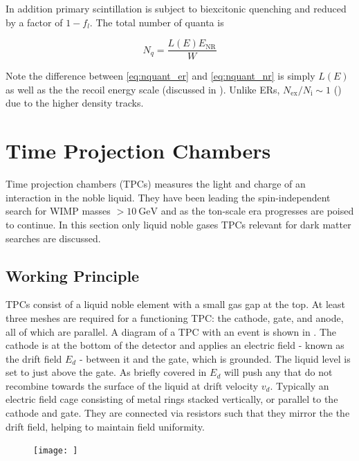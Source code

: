 In addition primary scintillation is subject to biexcitonic quenching and reduced by a factor of $1 - f_{l}$.  The total number of quanta
is

\begin{equation}
N_{q} = \frac{L(E) E_{\mathrm{NR}}}{W}
\label{eq:nquant_nr}
\end{equation}

\noindent Note the difference between \eqref{eq:nquant_er} and \eqref{eq:nquant_nr} is simply $L(E)$ as well as the the recoil energy
scale (discussed in \secref{}).  Unlike ERs, $N_{\mathrm{ex}} / N_{\mathrm{i}} \sim 1$ () due to the
higher density tracks.



\section{Time Projection Chambers}
\label{sec:tpcs}
Time projection chambers (TPCs) measures the light and charge of an interaction in the noble liquid.  They have been leading the
spin-independent search for WIMP masses $> 10\ \mathrm{GeV}$ and as the ton-scale era progresses are poised to continue.  In this section
only liquid noble gases TPCs relevant for dark matter searches are discussed.

\subsection{Working Principle}
\label{subsec:tpcs_working_principle}
TPCs consist of a liquid noble element with a small gas gap at the top.  At least three meshes are required for a functioning TPC: the
cathode, gate, and anode, all of which are parallel.  A diagram of a TPC with an event is shown in .  The cathode is
at the bottom of the detector and applies an electric field - known as the drift field $E_{d}$ - between
it and the gate, which is grounded.  The liquid level is set to just above the gate.  As briefly covered in 
$E_{d}$ will push any \electron that do not recombine towards the surface of the liquid at drift velocity $v_{d}$.  Typically an electric
field cage consisting
of metal rings stacked vertically, or parallel to the cathode and gate.  They are connected via resistors such that they mirror the
the drift field, helping to maintain field uniformity.

\begin{figure}
\texttt{[image: ]}
\label{fig:tpcs_tpc}
\end{figure}


